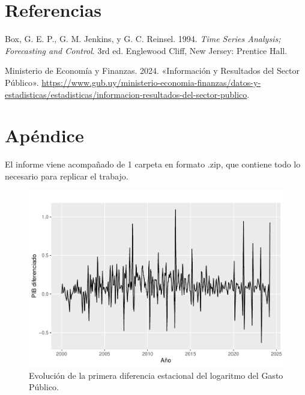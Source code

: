 \documentclass[
  12pt,
]{article}
\newlength{\cslhangindent}
\newlength{\cslentryspacingunit} %
\newenvironment{CSLReferences}[2] %
 {%
  \setlength{\parindent}{0pt}
  \ifodd #1
  \let\oldpar\par
  \def\par{\hangindent=\cslhangindent\oldpar}
  \fi
  \setlength{\parskip}{#2\cslentryspacingunit}
 }%
 {}
\begin{document}
\newpage

\hypertarget{referencias}{%
\section*{Referencias}\label{referencias}}

\hypertarget{refs}{}
\begin{CSLReferences}{1}{0}
\leavevmode{}%
Box, G. E. P., G. M. Jenkins, y G. C. Reinsel. 1994. \emph{Time Series
Analysis; Forecasting and Control}. 3rd ed. Englewood Cliff, New Jersey:
Prentice Hall.

\leavevmode{}%
Ministerio de Economía y Finanzas. 2024. {«{Información y Resultados del
Sector Público}»}.
\url{https://www.gub.uy/ministerio-economia-finanzas/datos-y-estadisticas/estadisticas/informacion-resultados-del-sector-publico}.

\end{CSLReferences}

\hypertarget{apuxe9ndice}{%
\section*{Apéndice}\label{apuxe9ndice}}

El informe viene acompañado de 1 carpeta en formato .zip,
que contiene todo lo necesario para replicar el trabajo. 

\begin{figure}[H]

{\centering \includegraphics[width=0.75\linewidth]{informe_files/figure-latex/unnamed-chunk-24-1} 

}

\caption{\label{dif-est-gasto} Evolución de la primera diferencia estacional del logaritmo del Gasto Público.}\label{fig:unnamed-chunk-24}
\end{figure}
\end{document}
